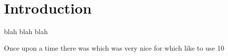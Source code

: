 \chapter{Introduction}
\label{chap:introduction}


blah blah blah

Once upon a time there was \chips which was very nice for \nova which like to use \unit{10}{\GeV}
